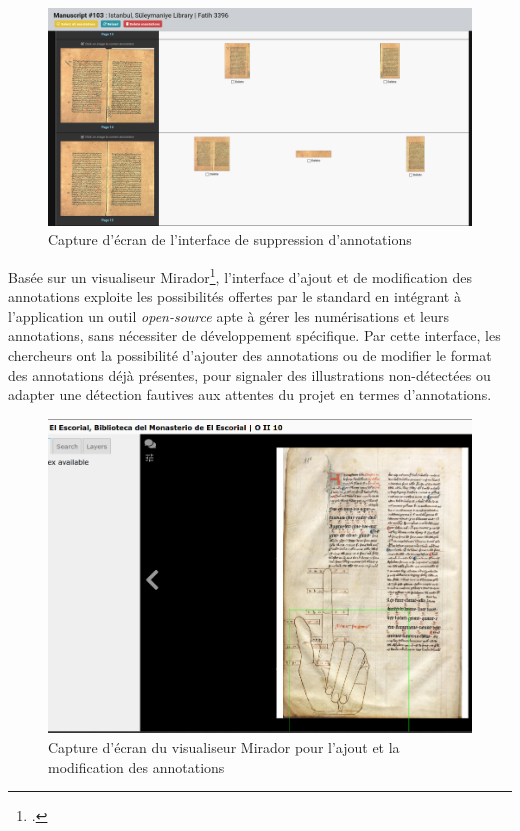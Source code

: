  	\begin{figure}[h]
	\centering
	\includegraphics[width=16cm]{images/eida_delete_anno.png}
	\caption{Capture d'écran de l'interface \eida de suppression d'annotations}
	\label{fig:eida_delete_anno}
\end{figure}

Basée sur un visualiseur Mirador\footcite{MiradorHomea}, l'interface d'ajout et de modification des annotations exploite les possibilités offertes par le standard \iiif en intégrant à l'application \eida un outil \textit{open-source} apte à gérer les numérisations et leurs annotations, sans nécessiter de développement spécifique. Par cette interface, les chercheurs ont la possibilité d'ajouter des annotations ou de modifier le format des annotations déjà présentes, pour signaler des illustrations non-détectées ou adapter une détection fautives aux attentes du projet en termes d'annotations.

 	\begin{figure}[h]
	\centering
	\includegraphics[width=14cm]{images/eida_add_anno.png}
	\caption{Capture d'écran du visualiseur Mirador \eida pour l'ajout et la modification des annotations}
	\label{fig:eida_add_anno}
\end{figure}

